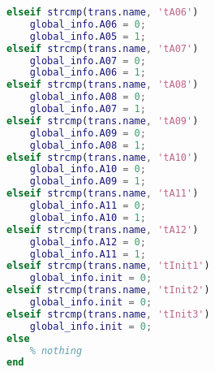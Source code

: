 \begin{lstlisting}[language=MATLAB, caption=COMMON\_POST.m]
elseif strcmp(trans.name, 'tA06')
    global_info.A06 = 0;
    global_info.A05 = 1;
elseif strcmp(trans.name, 'tA07')
    global_info.A07 = 0;
    global_info.A06 = 1;
elseif strcmp(trans.name, 'tA08')
    global_info.A08 = 0;
    global_info.A07 = 1;
elseif strcmp(trans.name, 'tA09')
    global_info.A09 = 0;
    global_info.A08 = 1;
elseif strcmp(trans.name, 'tA10')
    global_info.A10 = 0;
    global_info.A09 = 1;
elseif strcmp(trans.name, 'tA11')
    global_info.A11 = 0;
    global_info.A10 = 1;
elseif strcmp(trans.name, 'tA12')
    global_info.A12 = 0;
    global_info.A11 = 1;
elseif strcmp(trans.name, 'tInit1')
    global_info.init = 0;
elseif strcmp(trans.name, 'tInit2')
    global_info.init = 0;
elseif strcmp(trans.name, 'tInit3')
    global_info.init = 0;
else
    % nothing
end
\end{lstlisting}

